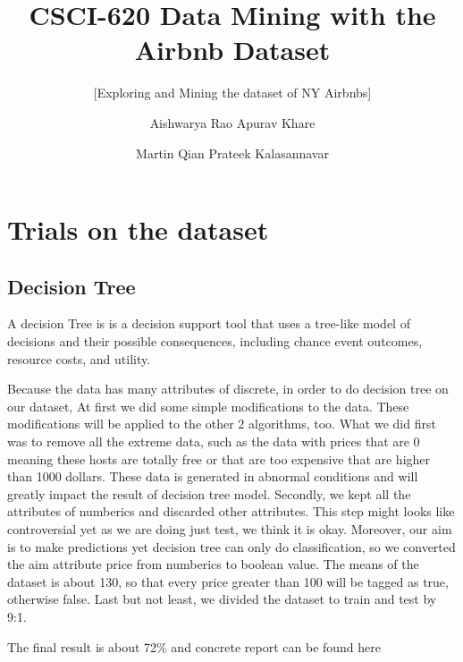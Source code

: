 \documentclass{sig-alternate}
\begin{document}
	\title{CSCI-620 Data Mining with the Airbnb Dataset}
	\subtitle{[Exploring and Mining the dataset of NY Airbnbs]}
	
	\author
	{
		\alignauthor
		Aishwarya Rao
		\alignauthor
		Apurav Khare
		\and
		\alignauthor
		Martin Qian
		\alignauthor
		Prateek Kalasannavar
	}
	
	\maketitle
	\begin{abstract}
		
	
	\end{abstract}
	
	\section{Trials on the dataset}
	\subsection{Decision Tree}
	A decision Tree is is a decision support tool that uses a tree-like model of decisions and their possible consequences, 
	including chance event outcomes, resource costs, and utility. 
	

	Because the data has many attributes of discrete, in order to do decision tree on our dataset, 
	At first we did some simple modifications to the data. These modifications will be applied to 
	the other 2 algorithms, too. What we did first was to remove all the extreme data, such as the data with prices
	that are 0 meaning these hosts are totally free or that are too expensive that are higher than 1000 dollars. These
	data is generated in abnormal conditions and will greatly impact the result of decision tree model.
	Secondly, we kept all the attributes of numberics and discarded other attributes. This step might looks like controversial
	yet as we are doing just test, we think it is okay. Moreover, our aim is to make predictions yet decision tree
	can only do classification, so we converted the aim attribute price from numberics to boolean value. The means of the
	dataset is about 130, so that every price greater than 100 will be tagged as true, otherwise false.
	Last but not least, we divided the dataset to train and test by 9:1. 

	The final result is about 72\% and concrete report can be found here
\end{document}

